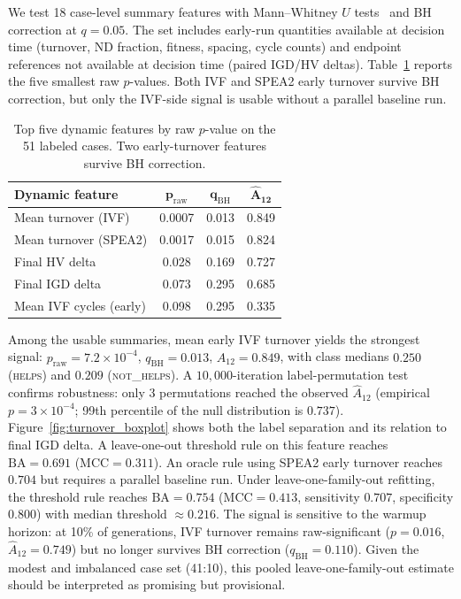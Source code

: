 \documentclass[runningheads]{llncs}
\begin{document}
We test 18 case-level summary features with Mann--Whitney $U$
tests~\cite{mann1947test} and BH correction at $q\!=\!0.05$. The set includes
early-run quantities available at decision time (turnover, ND fraction,
fitness, spacing, cycle counts) and endpoint references not available at
decision time (paired IGD/HV deltas).
Table~\ref{tab:dynamic_features} reports the five smallest raw $p$-values.
Both IVF and SPEA2 early turnover survive BH correction, but only the
IVF-side signal is usable without a parallel baseline run.

\begin{table}[t]
	\centering
	\caption{Top five dynamic features by raw $p$-value on the 51 labeled
		cases. Two early-turnover features survive BH correction.}
	\label{tab:dynamic_features}
	\begin{tabular}{lccc}
		\toprule
		\textbf{Dynamic feature}       & $\boldsymbol{p_{\mathrm{raw}}}$ &
		$\boldsymbol{q_{\mathrm{BH}}}$ & $\boldsymbol{\hat{A}_{12}}$                     \\
		\midrule
		Mean turnover (IVF)            & 0.0007                          & 0.013 & 0.849 \\
		Mean turnover (SPEA2)          & 0.0017                          & 0.015 & 0.824 \\
		Final HV delta                 & 0.028                           & 0.169 & 0.727 \\
		Final IGD delta                & 0.073                           & 0.295 & 0.685 \\
		Mean IVF cycles (early)        & 0.098                           & 0.295 & 0.335 \\
		\bottomrule
	\end{tabular}
\end{table}

Among the usable summaries, mean early IVF turnover yields the strongest
signal: $p_{\mathrm{raw}} = 7.2\times 10^{-4}$,
$q_{\mathrm{BH}} = 0.013$, $\hat{A}_{12} = 0.849$, with class medians
$0.250$ (\textsc{helps}) and $0.209$ (\textsc{not\_helps}). A
$10{,}000$-iteration label-permutation test confirms robustness: only 3
permutations reached the observed $\hat{A}_{12}$ (empirical
$p = 3 \times 10^{-4}$; 99th percentile of the null distribution is $0.737$).
Figure~\ref{fig:turnover_boxplot} shows both the label separation and its
relation to final IGD delta. A leave-one-out threshold rule on this feature
reaches $\mathrm{BA}\!=\!0.691$ ($\mathrm{MCC}\!=\!0.311$). An oracle rule
using SPEA2 early turnover reaches $0.704$ but requires a parallel baseline
run.
Under leave-one-family-out refitting, the threshold rule reaches
$\mathrm{BA}\!=\!0.754$ ($\mathrm{MCC}\!=\!0.413$, sensitivity $0.707$,
specificity $0.800$) with median threshold $\approx 0.216$. The signal is
sensitive to the warmup horizon: at 10\% of generations, IVF turnover remains
raw-significant ($p\!=\!0.016$, $\hat{A}_{12}\!=\!0.749$) but no longer
survives BH correction ($q_{\mathrm{BH}}\!=\!0.110$).
Given the modest and imbalanced case set (41:10), this pooled
leave-one-family-out estimate should be interpreted as promising but
provisional.
\end{document}
